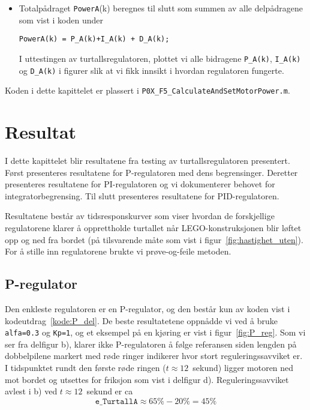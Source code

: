 \begin{itemize}
\item Totalpådraget {\tt PowerA}(k) beregnes til slutt 
  som summen av alle delpådragene
  som vist i koden under
  \begin{lstlisting}[caption=Kode for totalpådraget {\tt PowerA(k)} for motor A., 
    label=kode:PID, firstnumber=21]
    PowerA(k) = P_A(k)+I_A(k) + D_A(k);
  \end{lstlisting}
  I uttestingen av turtallsregulatoren, plottet vi alle
  bidragene {\tt P\_A(k)},  {\tt I\_A(k)} og  {\tt D\_A(k)}  i figurer
  slik at vi fikk innsikt i hvordan regulatoren fungerte.
\end{itemize}

Koden i dette kapittelet er plassert i {\tt P0X\_F5\_CalculateAndSetMotorPower.m}.

\newpage

\section{Resultat}
I dette kapittelet blir resultatene fra testing av turtallsregulatoren
presentert. Først presenteres resultatene for P-regulatoren med dens 
begrensinger. Deretter presenteres resultatene for PI-regulatoren og vi
dokumenterer behovet for integratorbegrensing. Til slutt presenteres 
resultatene for PID-regulatoren.

Resultatene består av tidsresponskurver som viser hvordan de forskjellige
regulatorene klarer å opprettholde turtallet når LEGO-konstruksjonen
blir løftet opp og ned fra bordet (på tilsvarende måte som vist i 
figur~\ref{fig:hastighet_uten}). 
For å stille inn regulatorene brukte vi prøve-og-feile metoden.


\subsection{P-regulator}
Den enkleste regulatoren er en P-regulator, og den består kun av koden
vist i kodeutdrag~\ref{kode:P_del}. De beste resultatetene oppnådde vi
ved å bruke {\tt alfa=0.3} og {\tt Kp=1}, og et eksempel på en kjøring
er  vist i figur~\ref{fig:P_reg}. 
Som vi ser fra delfigur b), klarer ikke P-regulatoren å 
følge referansen siden lengden på dobbelpilene markert med røde ringer indikerer hvor stort
reguleringssavviket  er. I tidspunktet rundt den
første røde ringen ($t{\approx}12$~sekund) ligger motoren ned mot
bordet og utsettes for friksjon som vist i delfigur
d). Reguleringssavviket avlest i b) ved $t{\approx}12$~sekund er ca 
\begin{equation}
  \label{eq:5}
  \mathtt{e\_{TurtallA}}\approx 65\%- 20\% = 45\%
\end{equation}

